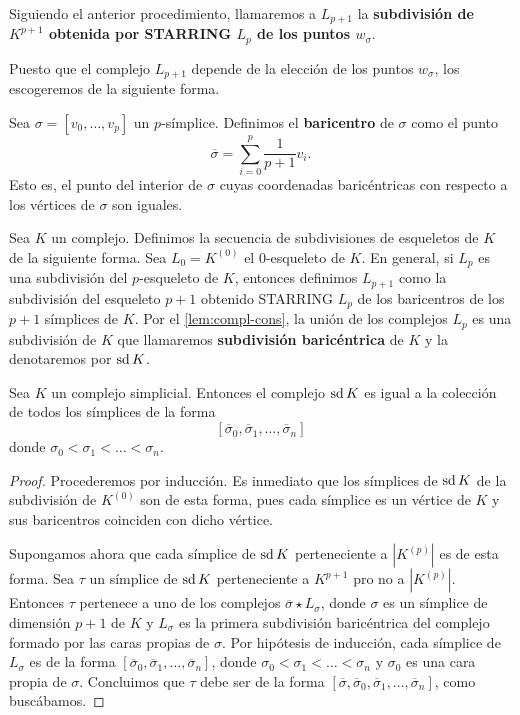 \begin{definicion}
	Siguiendo el anterior procedimiento, llamaremos a $L_{p+1}$ la \textbf{subdivisión de $K^{p+1}$ obtenida por STARRING $L_p$ de los puntos $w_{\sigma}$}.
\end{definicion}
Puesto que el complejo $L_{p+1}$ depende de la elección de los puntos $w_{\sigma}$, los escogeremos de la siguiente forma.
\begin{definicion}
	Sea $\sigma = [v_0, \dots, v_p]$ un $p$-símplice. Definimos el \textbf{baricentro} de $\sigma$ como el punto
	\[
	\overline{\sigma} = \sum_{i=0}^{p}\frac{1}{p+1} v_i.
	\]
	Esto es, el punto del interior de $\sigma$ cuyas coordenadas baricéntricas con respecto a los vértices de $\sigma$ son iguales.
\end{definicion}
\begin{definicion}
	Sea $K$ un complejo. Definimos la secuencia de subdivisiones de esqueletos de $K$ de la siguiente forma. Sea $L_0 = K^(0)$ el $0$-esqueleto de $K$. En general, si $L_p$ es una subdivisión del $p$-esqueleto de $K$, entonces definimos $L_{p+1}$ como la subdivisión del esqueleto $p+1$ obtenido STARRING $L_p$ de los baricentros de los $p+1$ símplices de $K$. Por el \autoref{lem:compl-cons}, la unión de los complejos $L_p$ es una subdivisión de $K$ que llamaremos \textbf{subdivisión baricéntrica} de $K$ y la denotaremos por $\operatorname{sd} K$.
\end{definicion}
\begin{lema}
	Sea $K$ un complejo simplicial. Entonces el complejo $\operatorname{sd} K$ es igual a la colección de todos los símplices de la forma
	\[
		[\overline{\sigma}_0,\overline{\sigma}_1,\dots,\overline{\sigma}_n]
	\]
	donde $\sigma_0 < \sigma_1 < \dots < \sigma_n$.
\end{lema}
\begin{proof}
	Procederemos por inducción. Es inmediato que los símplices de $\operatorname{sd} K$ de la subdivisión de $K^{(0)}$ son de esta forma, pues cada símplice es un vértice de $K$ y sus baricentros coinciden con dicho vértice.
	
	Supongamos ahora que cada símplice de $\operatorname{sd} K$ perteneciente a $|K^{(p)}|$ es de esta forma. Sea $\tau$ un símplice de $\operatorname{sd} K$ perteneciente a $K^{p+1}$ pro no a $|K^{(p)}|$. Entonces $\tau$ pertenece a uno de los complejos $\overline{\sigma} \star L_{\sigma}$, donde $\sigma$ es un símplice de dimensión $p+1$ de $K$ y $L_{\sigma}$ es la primera subdivisión baricéntrica del complejo formado por las caras propias de $\sigma$. Por hipótesis de inducción, cada símplice de $L_{\sigma}$ es de la forma $[\overline{\sigma}_0,\overline{\sigma}_1,\dots,\overline{\sigma}_n]$, donde $\sigma_0 < \sigma_1 < \dots < \sigma_n$ y $\sigma_0$ es una cara propia de $\sigma$. Concluimos que $\tau$ debe ser de la forma $[\overline{\sigma},\overline{\sigma}_0,\overline{\sigma}_1,\dots,\overline{\sigma}_n]$, como buscábamos.
\end{proof}

